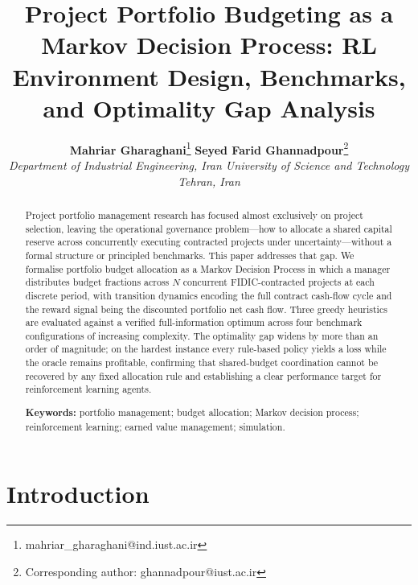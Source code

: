 \documentclass[11pt,a4paper]{article}
\title{\textbf{Project Portfolio Budgeting as a Markov Decision Process:
RL Environment Design, Benchmarks, and Optimality Gap Analysis}}
\author{
\begin{tabular}{c}
    \textbf{Mahriar Gharaghani}\thanks{mahriar\_gharaghani@ind.iust.ac.ir} \quad
    \textbf{Seyed Farid Ghannadpour}\thanks{Corresponding author: ghannadpour@iust.ac.ir} \\[6pt]
    \textit{Department of Industrial Engineering, Iran University of Science and Technology} \\
    \textit{Tehran, Iran}
\end{tabular}
}
\date{}
\theoremstyle{definition}
\theoremstyle{remark}
\begin{document}
\maketitle


\begin{abstract}

  Project portfolio management research has focused almost exclusively on
  project selection, leaving the operational governance problem---how to
  allocate a shared capital reserve across concurrently executing contracted
  projects under uncertainty---without a formal structure or principled
  benchmarks. This paper addresses that gap. We formalise portfolio budget
  allocation as a Markov Decision Process in which a manager distributes
  budget fractions across $N$ concurrent FIDIC-contracted projects at each
  discrete period, with transition dynamics encoding the full contract
  cash-flow cycle and the reward signal being the discounted portfolio net
  cash flow. Three greedy heuristics are evaluated against a verified
  full-information optimum across four benchmark configurations of increasing
  complexity. The optimality gap widens by more than an order of magnitude;
  on the hardest instance every rule-based policy yields a loss while the
  oracle remains profitable, confirming that shared-budget coordination cannot
  be recovered by any fixed allocation rule and establishing a clear
  performance target for reinforcement learning agents.

  \medskip
  \noindent\textbf{Keywords:} portfolio management; budget allocation;
  Markov decision process; reinforcement learning; earned value management;
  simulation.

  \end{abstract}

\FloatBarrier


\section{Introduction}
\label{sec:introduction}


\FloatBarrier

\end{document}
